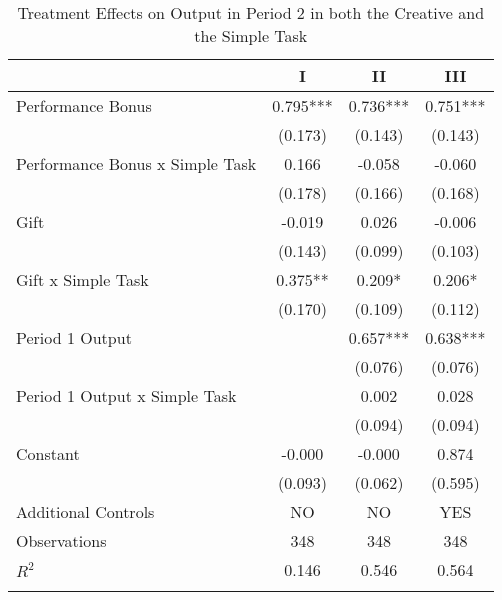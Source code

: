 \begin{table}[h]%
\captionsetup{justification=centering}
\setlength\tabcolsep{2pt}
\caption{Treatment Effects on Output in Period 2 in both the Creative and the Simple Task}
\begin{center}%
{\small\renewcommand{\arraystretch}{1}%
\begin{tabular}{lccc}
\hline\noalign{\smallskip}
 & I & II & III \\
\hline\noalign{\smallskip}
Performance Bonus   &       0.795***&       0.736***&       0.751***\\
                    &     (0.173)   &     (0.143)   &     (0.143)   \\[2mm]
Performance Bonus x Simple Task&       0.166   &      -0.058   &      -0.060   \\
                    &     (0.178)   &     (0.166)   &     (0.168)   \\[2mm]
Gift                &      -0.019   &       0.026   &      -0.006   \\
                    &     (0.143)   &     (0.099)   &     (0.103)   \\[2mm]
Gift x Simple Task  &       0.375** &       0.209*  &       0.206*  \\
                    &     (0.170)   &     (0.109)   &     (0.112)   \\[2mm]
Period 1 Output     &               &       0.657***&       0.638***\\
                    &               &     (0.076)   &     (0.076)   \\[2mm]
Period 1 Output x Simple Task&               &       0.002   &       0.028   \\
                    &               &     (0.094)   &     (0.094)   \\[2mm]
Constant            &      -0.000   &      -0.000   &       0.874   \\
                    &     (0.093)   &     (0.062)   &     (0.595)   \\[2mm]
\noalign{\smallskip}\hline
Additional Controls & NO & NO & YES \\
\hline
Observations        &         348   &         348   &         348   \\
$R^2$               &       0.146   &       0.546   &       0.564   \\
\hline\noalign{\medskip}
\end{tabular}
\begin{minipage}{\textwidth} \setlength{\parindent}{15pt}

\end{minipage}}
\end{center}
\end{table}
